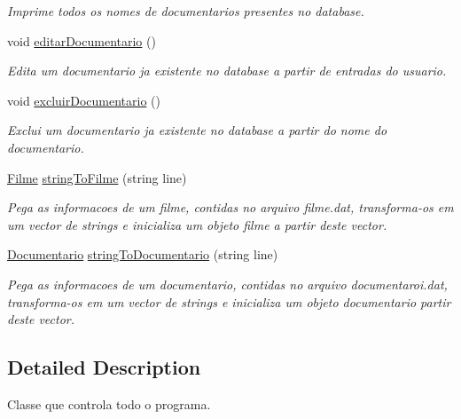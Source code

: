 \begin{DoxyCompactItemize}
\begin{DoxyCompactList}\small\item\em Imprime todos os nomes de documentarios presentes no database. \end{DoxyCompactList}\item 
void \hyperlink{classController_a8e3af17b91fb97c424f71763a52efc7c}{editar\+Documentario} ()\hypertarget{classController_a8e3af17b91fb97c424f71763a52efc7c}{}\label{classController_a8e3af17b91fb97c424f71763a52efc7c}

\begin{DoxyCompactList}\small\item\em Edita um documentario ja existente no database a partir de entradas do usuario. \end{DoxyCompactList}\item 
void \hyperlink{classController_add9e27a70f03537309a7baed09bd94fd}{excluir\+Documentario} ()\hypertarget{classController_add9e27a70f03537309a7baed09bd94fd}{}\label{classController_add9e27a70f03537309a7baed09bd94fd}

\begin{DoxyCompactList}\small\item\em Exclui um documentario ja existente no database a partir do nome do documentario. \end{DoxyCompactList}\item 
\hyperlink{classFilme}{Filme} \hyperlink{classController_aafde6d0c728bb9d12250e3d7da8f9706}{string\+To\+Filme} (string line)
\begin{DoxyCompactList}\small\item\em Pega as informacoes de um filme, contidas no arquivo filme.\+dat, transforma-\/os em um vector de strings e inicializa um objeto filme a partir deste vector. \end{DoxyCompactList}\item 
\hyperlink{classDocumentario}{Documentario} \hyperlink{classController_a159cba9377da81c1c235aafa16c4ca1a}{string\+To\+Documentario} (string line)
\begin{DoxyCompactList}\small\item\em Pega as informacoes de um documentario, contidas no arquivo documentaroi.\+dat, transforma-\/os em um vector de strings e inicializa um objeto documentario partir deste vector. \end{DoxyCompactList}\end{DoxyCompactItemize}


\subsection{Detailed Description}
Classe que controla todo o programa. 

